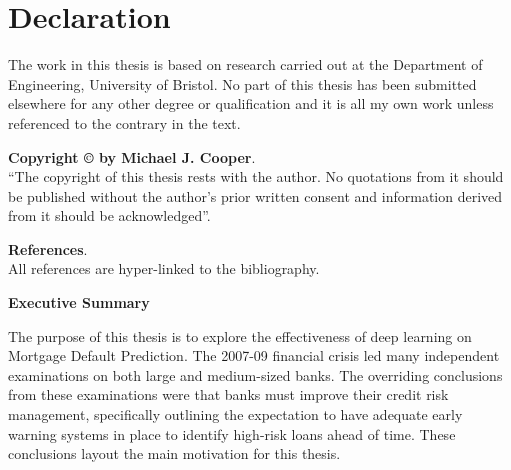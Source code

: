 \chapter*{Declaration}
The work in this thesis is based on research carried out at the Department of Engineering, University of Bristol. No part of this thesis has been submitted elsewhere for any other degree or qualification and it is all
my own work unless referenced to the contrary in the text.



\vspace{2in}
\noindent \textbf{Copyright \copyright{} by Michael J. Cooper}.\\
``The copyright of this thesis rests with the author.  No quotations
from it should be published without the author's prior written consent
and information derived from it should be acknowledged''.

\vspace{1.5in}
\noindent \textbf{References}.\\
All references are hyper-linked to the bibliography.






\newpage
\thispagestyle{empty}
\begin{center}
  \vspace*{0cm}
  \textbf{\LARGE Executive Summary}
\end{center}

The purpose of this thesis is to explore the effectiveness of deep learning on Mortgage Default Prediction. The 2007-09 financial crisis led many independent examinations on both large and medium-sized banks. The overriding conclusions from these examinations were that banks must improve their credit risk management, specifically outlining the expectation to have adequate early warning systems in place to identify high-risk loans ahead of time. These conclusions layout the main motivation for this thesis.  

